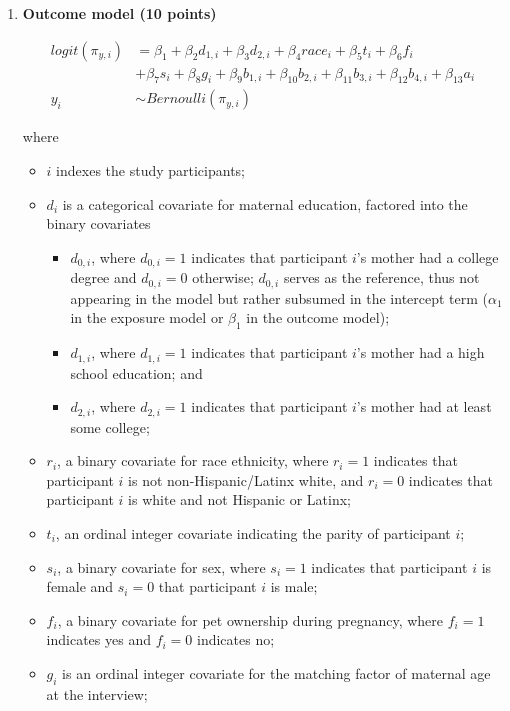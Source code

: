 \documentclass[
  11pt,
]{article}
\begin{document}
\begin{enumerate}[label=\textbf{\arabic*.}]
\begin{enumerate}[label=\textbf{\alph*.}]
    \item \textbf{Outcome model (10 points)}

\begin{align*}
logit(\pi_{y,i}) &= \beta_1 + \beta_2 d_{1,i} + \beta_3 d_{2,i} + \beta_4 race_i + \beta_5 t_i + \beta_6 f_i \\
  &+ \beta_7 s_i + \beta_8 g_i + \beta_9 b_{1,i} + \beta_{10} b_{2,i} + \beta_{11} b_{3,i} + \beta_{12} b_{4,i} + \beta_{13} a_i \\
y_i &\sim Bernoulli(\pi_{y,i})
\end{align*}

where

\begin{itemize}
  \item $i$ indexes the study participants;
  \item $d_i$ is a categorical covariate for maternal education, factored into the binary covariates
  \begin{itemize}
    \item $d_{0,i}$, where $d_{0,i} = 1$ indicates that participant $i$'s mother had a college degree and $d_{0,i} = 0$ otherwise; $d_{0,i}$ serves as the reference, thus not appearing in the model but rather subsumed in the intercept term ($\alpha_1$ in the exposure model or $\beta_1$ in the outcome model);
    \item $d_{1,i}$, where $d_{1,i} = 1$ indicates that participant $i$'s mother had a high school education; and
    \item $d_{2,i}$, where $d_{2,i} = 1$ indicates that participant $i$'s mother had at least some college;
  \end{itemize}
  \item $r_i$, a binary covariate for race ethnicity, where $r_i = 1$ indicates that participant $i$ is not non-Hispanic/Latinx white, and $r_i = 0$ indicates that participant $i$ is white and not Hispanic or Latinx;
  \item $t_i$, an ordinal integer covariate indicating the parity of participant $i$;
  \item $s_i$, a binary covariate for sex, where $s_i = 1$ indicates that participant $i$ is female and $s_i = 0$ that participant $i$ is male;
  \item $f_i$, a binary covariate for pet ownership during pregnancy, where $f_i = 1$ indicates yes and $f_i = 0$ indicates no;
  \item $g_i$ is an ordinal integer covariate for the matching factor of maternal age at the interview;

\end{itemize}
\end{enumerate}
\end{enumerate}
\end{document}
